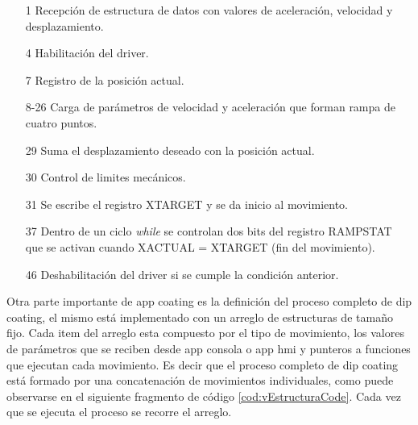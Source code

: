 \begin{itemize}
\item [1] Recepción de estructura de datos con valores de aceleración, velocidad y desplazamiento.
\item [4] Habilitación del driver.
\item [7] Registro de la posición actual.
\item [8-26] Carga de parámetros de velocidad y aceleración que forman rampa de cuatro puntos.
\item [29] Suma el desplazamiento deseado con la posición actual.
\item [30] Control de limites mecánicos.
\item [31] Se escribe el registro XTARGET y se da inicio al movimiento.
\item [37] Dentro de un ciclo \textit{while} se controlan dos bits del registro RAMPSTAT que se activan cuando XACTUAL = XTARGET (fin del movimiento).
\item [46] Deshabilitación del driver si se cumple la condición anterior.  
\end{itemize}


Otra parte importante de app coating es la definición del proceso completo de dip coating, el mismo está implementado con un arreglo de estructuras de tamaño fijo. Cada item del arreglo esta compuesto por el tipo de movimiento, los valores de parámetros que se reciben desde app consola o app hmi y punteros a funciones que ejecutan cada movimiento. Es decir que el proceso completo de dip coating está formado por una concatenación de movimientos individuales, como puede observarse en el siguiente fragmento de código \ref{cod:vEstructuraCode}. Cada vez que se ejecuta el proceso se recorre el arreglo.




